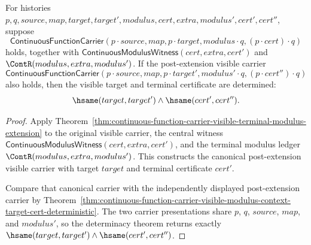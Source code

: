 \begin{theorem}
\label{thm:continuous-function-carrier-visible-terminal-modulus-extension-output-determinacy}
For histories
$p,q,source,map,target,target',modulus,cert,extra,modulus',cert',cert''$,
suppose
$$
\mathsf{ContinuousFunctionCarrier}(p\cdot source,map,p\cdot target,
modulus\cdot q,(p\cdot cert)\cdot q)
$$
holds, together with
$\mathsf{ContinuousModulusWitness}(cert,extra,cert')$ and
$\ContR(modulus,extra,modulus')$. If the post-extension visible carrier
$$
\mathsf{ContinuousFunctionCarrier}(p\cdot source,map,p\cdot target',
modulus'\cdot q,(p\cdot cert'')\cdot q)
$$
also holds, then the visible target and terminal certificate are determined:
$$
\hsame(target,target')\land\hsame(cert',cert'').
$$
\end{theorem}
\begin{proof}
Apply
Theorem~\ref{thm:continuous-function-carrier-visible-terminal-modulus-extension}
to the original visible carrier, the central witness
$\mathsf{ContinuousModulusWitness}(cert,extra,cert')$, and the terminal modulus
ledger $\ContR(modulus,extra,modulus')$. This constructs the canonical
post-extension visible carrier with target $target$ and terminal certificate
$cert'$.

Compare that canonical carrier with the independently displayed post-extension
carrier by
Theorem~\ref{thm:continuous-function-carrier-visible-modulus-context-target-cert-deterministic}.
The two carrier presentations share $p$, $q$, $source$, $map$, and $modulus'$,
so the determinacy theorem returns exactly
$\hsame(target,target')\land\hsame(cert',cert'')$.
\end{proof}


